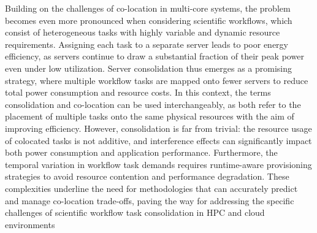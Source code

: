 Building on the challenges of co-location in multi-core systems, the problem becomes even more pronounced when considering scientific workflows, which consist of heterogeneous tasks with highly variable and dynamic resource requirements. Assigning each task to a separate server leads to poor energy efficiency, as servers continue to draw a substantial fraction of their peak power even under low utilization. Server consolidation thus emerges as a promising strategy, where multiple workflow tasks are mapped onto fewer servers to reduce total power consumption and resource costs. In this context, the terms consolidation and co-location can be used interchangeably, as both refer to the placement of multiple tasks onto the same physical resources with the aim of improving efficiency. However, consolidation is far from trivial: the resource usage of colocated tasks is not additive, and interference effects can significantly impact both power consumption and application performance. Furthermore, the temporal variation in workflow task demands requires runtime-aware provisioning strategies to avoid resource contention and performance degradation. These complexities underline the need for methodologies that can accurately predict and manage co-location trade-offs, paving the way for addressing the specific challenges of scientific workflow task consolidation in HPC and cloud environments \cite{5644899}

